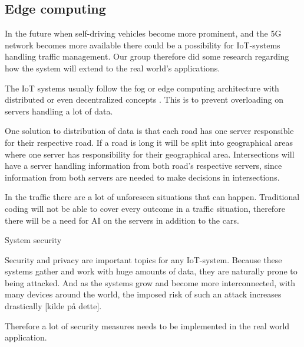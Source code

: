 
\subsection{Edge computing}
In the future when self-driving vehicles become more prominent, and the 5G network becomes more available there could be a possibility for IoT-systems handling traffic management. Our group therefore did some research regarding how the system will extend to the real world’s applications. 

The IoT systems usually follow the fog or edge computing architecture with distributed or even decentralized concepts \parencite[pp 149]{iot_platforms}. This is to prevent overloading on servers handling a lot of data. 

One solution to distribution of data is that each road has one server responsible for their respective road. If a road is long it will be split into geographical areas where one server has responsibility for their geographical area. Intersections will have a server handling information from both road’s respective servers, since information from both servers are needed to make decisions in intersections.

In the traffic there are a lot of unforeseen situations that can happen. Traditional coding will not be able to cover every outcome in a traffic situation, therefore there will be a need for AI on the servers in addition to the cars. 

System security

Security and privacy are important topics for any IoT-system. Because these systems gather and work with huge amounts of data, they are naturally prone to being attacked. And as the systems grow and become more interconnected, with many devices around the world, the imposed risk of such an attack increases drastically [kilde på dette].

Therefore a lot of security measures needs to be implemented in the real world application.

